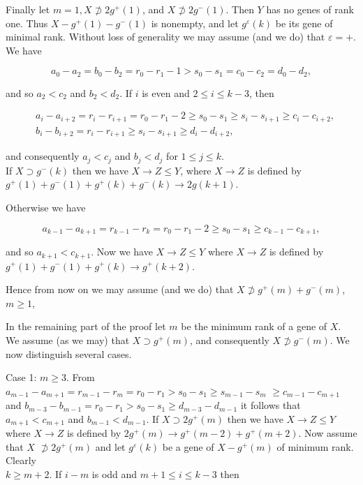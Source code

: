 \documentclass[10pt]{article}
\begin{document}
Finally let $m=1, X \not \supset 2 g^{+}(1)$, and $X \not \supset 2 g^{-}(1)$. Then $Y$ has no genes of rank one. Thus $X-g^{+}(1)-g^{-}(1)$ is nonempty, and let $g^{\varepsilon}(k)$ be its gene of minimal rank. Without loss of generality we may assume (and we do) that $\varepsilon=+$. We have

$$
a_{0}-a_{2}=b_{0}-b_{2}=r_{0}-r_{1}-1>s_{0}-s_{1}=c_{0}-c_{2}=d_{0}-d_{2},
$$

and so $a_{2}<c_{2}$ and $b_{2}<d_{2}$. If $i$ is even and $2 \leqslant i \leqslant k-3$, then

$$
\begin{aligned}
& a_{i}-a_{i+2}=r_{i}-r_{i+1}=r_{0}-r_{1}-2 \geqslant s_{0}-s_{1} \geqslant s_{i}-s_{i+1} \geqslant c_{i}-c_{i+2}, \\
& b_{i}-b_{i+2}=r_{i}-r_{i+1} \geqslant s_{i}-s_{i+1} \geqslant d_{i}-d_{i+2},
\end{aligned}
$$

and consequently $a_{j}<c_{j}$ and $b_{j}<d_{j}$ for $1 \leqslant j \leqslant k$.\\
If $X \supset g^{-}(k)$ then we have $X \rightarrow Z \leqslant Y$, where $X \rightarrow Z$ is defined by $g^{+}(1)+g^{-}(1)+g^{+}(k)+g^{-}(k) \rightarrow 2 g(k+1)$.

Otherwise we have

$$
a_{k-1}-a_{k+1}=r_{k-1}-r_{k}=r_{0}-r_{1}-2 \geqslant s_{0}-s_{1} \geqslant c_{k-1}-c_{k+1},
$$

and so $a_{k+1}<c_{k+1}$. Now we have $X \rightarrow Z \leqslant Y$ where $X \rightarrow Z$ is defined by $g^{+}(1)+g^{-}(1)+g^{+}(k) \rightarrow g^{+}(k+2)$.

Hence from now on we may assume (and we do) that $X \not \supset g^{+}(m)+g^{-}(m)$, $m \geqslant 1$,

In the remaining part of the proof let $m$ be the minimum rank of a gene of $X$. We assume (as we may) that $X \supset g^{+}(m)$, and consequently $X \not \supset g^{-}(m)$. We now distinguish several cases.

Case 1: $m \geqslant 3$. From $a_{m-1}-a_{m+1}=r_{m-1}-r_{m}=r_{0}-r_{1}>s_{0}-s_{1} \geqslant s_{m-1}-s_{m}$ $\geqslant c_{m-1}-c_{m+1}$ and $b_{m-3}-b_{m-1}=r_{0}-r_{1}>s_{0}-s_{1} \geqslant d_{m-3}-d_{m-1}$ it follows that $a_{m+1}<c_{m+1}$ and $b_{m-1}<d_{m-1}$. If $X \supset 2 g^{+}(m)$ then we have $X \rightarrow Z \leqslant Y$ where $X \rightarrow Z$ is defined by $2 g^{+}(m) \rightarrow g^{+}(m-2)+g^{+}(m+2)$. Now assume that $X$ $\not \supset 2 g^{+}(m)$ and let $g^{\varepsilon}(k)$ be a gene of $X-g^{+}(m)$ of minimum rank. Clearly\\
$k \geqslant m+2$. If $i-m$ is odd and $m+1 \leqslant i \leqslant k-3$ then
\end{document}
